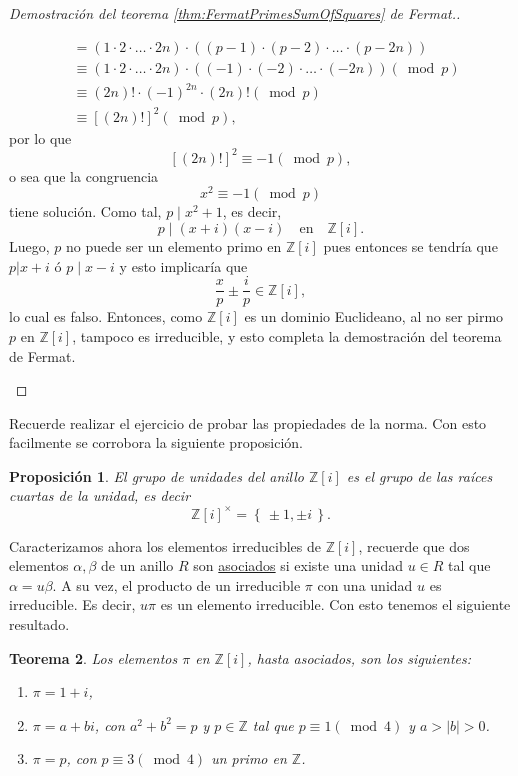 \documentclass{amsbook}
\renewcommand{\.}{\cdot}
\renewcommand{\:}{\colon}               %
\newcommand{\x}{\times}
\newcommand{\bZ}{\mathbb{Z}}    %
\newcommand{\set}[1]{\left\{\,#1\,\right\}}    %
\newcommand{\word}[1]{\quad\mbox{#1}\quad} %
\newcommand{\al}{\alpha}                %
\newcommand{\bt}{\beta}                 %
\newcommand{\un}{\underline}       %
\newcommand{\term}[1]{\un{#1}\index{#1}}
\theoremstyle{plain}
\newtheorem{Th}{Teorema}[section]   %
\newtheorem{Prop}[Th]{Proposición}     %
\theoremstyle{definition}
\theoremstyle{remark}
\numberwithin{equation}{section}
\begin{document}
\begin{proof}[Demostración del teorema \ref{thm:FermatPrimesSumOfSquares} de Fermat.]
\begin{enumerate}
\begin{align*}
            &=(1\.2\.\dots\.2n)\.((p-1)\.(p-2)\.\dots\.(p-2n))\\
            &\equiv(1\.2\.\dots\.2n)\.((-1)\.(-2)\.\dots\.(-2n))(\bmod p)\\
            &\equiv(2n)!\.(-1)^{2n}\.(2n)!(\bmod p)\\
            &\equiv[(2n)!]^2(\bmod p),
        \end{align*}
        por lo que 
        $$[(2n)!]^2\equiv -1(\bmod p),$$
        o sea que la congruencia
        $$x^2\equiv-1(\bmod p)$$
        tiene solución. Como tal, $p\mid x^2+1$, es decir, 
        $$p\mid(x+i)(x-i)\word{en}\bZ[i].$$
        Luego, $p$ no puede ser un elemento primo en $\bZ[i]$ pues entonces se tendría que $p|x+i$ ó $p\mid x-i$ y esto implicaría que
        $$\frac{x}{p}\pm\frac{i}{p}\in\bZ[i],$$
        lo cual es falso. Entonces, como $\bZ[i]$ es un dominio Euclideano, al no ser pirmo $p$ en $\bZ[i]$, tampoco es irreducible, y esto completa la demostración del teorema de Fermat.
    \end{enumerate}
\end{proof}

Recuerde realizar el ejercicio de probar las propiedades de la norma. Con esto facilmente se corrobora la siguiente proposición. 

\begin{Prop}
    El grupo de unidades del anillo $\bZ[i]$ es el grupo de las raíces cuartas de la unidad, es decir
    $$\bZ[i]^\x=\set{\pm1,\pm i}.$$
\end{Prop}

Caracterizamos ahora los elementos irreducibles de $\bZ[i]$, recuerde que dos elementos $\al,\bt$ de un anillo $R$ son \term{asociados} si existe una unidad $u\in R$ tal que $\al=u\bt$. A su vez, el producto de un irreducible $\pi$ con una unidad $u$ es irreducible. Es decir, $u\pi$ es un elemento irreducible. Con esto tenemos el siguiente resultado.

\begin{Th}
    Los elementos $\pi$ en $\bZ[i]$, hasta asociados, son los siguientes:
    \begin{enumerate}
        \item $\pi=1+i$,
        \item $\pi=a+bi$, con $a^2+b^2=p$ y $p\in\bZ$ tal que $p\equiv1(\bmod 4)$ y $a>|b|>0$.
        \item $\pi=p$, con $p\equiv3(\bmod 4)$ un primo en $\bZ$.
    \end{enumerate}
\end{Th}
\end{document}
